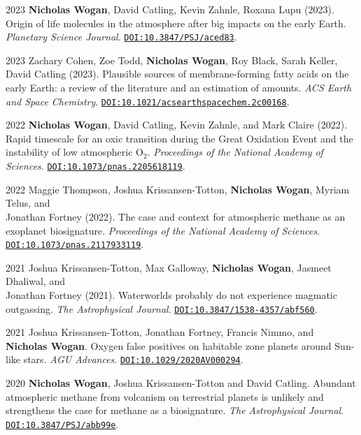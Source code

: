\documentclass{article}
\begin{document}
\begin{cvlist}
\item[2023]
  \textbf{Nicholas Wogan}, David Catling, Kevin Zahnle, Roxana Lupu (2023). Origin of life molecules in the atmosphere after big impacts on the early Earth. \emph{Planetary Science Journal}. \href{https://doi.org/10.3847/PSJ/aced83}{\nolinkurl{DOI:10.3847/PSJ/aced83}}.
\item[2023]
  Zachary Cohen, Zoe Todd, \textbf{Nicholas Wogan}, Roy Black, Sarah Keller, David Catling (2023). Plausible sources of membrane-forming fatty acids on the early Earth: a review of the literature and an estimation of amounts. \emph{ACS Earth and Space Chemistry}. \href{https://doi.org/10.1021/acsearthspacechem.2c00168}{\nolinkurl{DOI:10.1021/acsearthspacechem.2c00168}}.
\item[2022]
  \textbf{Nicholas Wogan}, David Catling, Kevin Zahnle, and Mark Claire (2022). Rapid timescale for an oxic transition during the Great Oxidation Event and the instability of low atmospheric O$_2$. \emph{Proceedings of the National Academy of Sciences}. \href{https://doi.org/10.1073/pnas.2205618119}{\nolinkurl{DOI:10.1073/pnas.2205618119}}.
\item[2022]
  Maggie Thompson, Joshua Krissansen-Totton, \textbf{Nicholas Wogan}, Myriam Telus, and \\Jonathan Fortney (2022). The case and context for atmospheric methane as an exoplanet biosignature. \emph{Proceedings of the National Academy of Sciences}. \href{https://doi.org/10.1073/pnas.2117933119}{\nolinkurl{DOI:10.1073/pnas.2117933119}}.
\item[2021]
  Joshua Krissansen-Totton, Max Galloway, \textbf{Nicholas Wogan}, Jasmeet Dhaliwal, and \\Jonathan Fortney (2021). Waterworlds probably do not experience magmatic outgassing. \emph{The Astrophysical Journal}. \href{https://doi.org/10.3847/1538-4357/abf560}{\nolinkurl{DOI:10.3847/1538-4357/abf560}}.
\item[2021]
  Joshua Krissansen-Totton, Jonathan Fortney, Francis Nimmo, and \textbf{Nicholas Wogan}. Oxygen false positives on habitable zone planets around Sun-like stars. \emph{AGU Advances}. \href{https://doi.org/10.1029/2020AV000294}{\nolinkurl{DOI:10.1029/2020AV000294}}.
\item[2020]
  \textbf{Nicholas Wogan}, Joshua Krissansen-Totton and David Catling. Abundant atmospheric methane from volcanism on terrestrial planets is unlikely and strengthens the case for methane as a biosignature. \emph{The Astrophysical Journal}. \href{https://doi.org/10.3847/PSJ/abb99e}{\nolinkurl{DOI:10.3847/PSJ/abb99e}}.

\end{cvlist}
\end{document}
